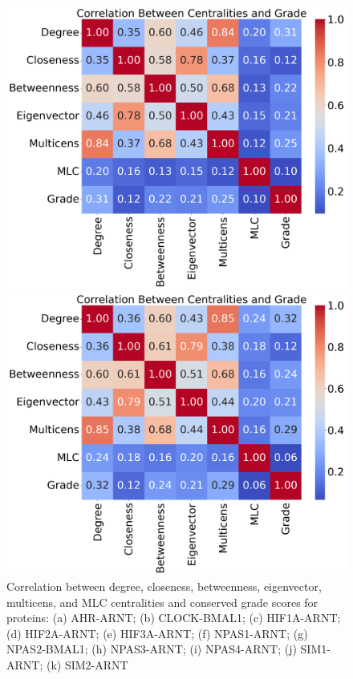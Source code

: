 \documentclass[10pt,letterpaper]{article}
\begin{document}
\begin{figure}[h!]
\begin{minipage}[b]{0.28\linewidth}
	\centering
	\includegraphics[width=\textwidth]{figs/fig37-sim1_arnt-corr.png}
	\subcaption{}
\end{minipage}
\hspace{0.5cm}
\begin{minipage}[b]{0.28\linewidth}
	\centering
	\includegraphics[width=\textwidth]{figs/fig38-sim2_arnt-corr.png}
	\subcaption{}
\end{minipage}

\caption{Correlation between degree, closeness, betweenness, eigenvector, multicens, and MLC centralities and conserved grade scores for proteins: (a) AHR-ARNT; (b) CLOCK-BMAL1; (c) HIF1A-ARNT; (d) HIF2A-ARNT; (e) HIF3A-ARNT; (f) NPAS1-ARNT; (g) NPAS2-BMAL1; (h) NPAS3-ARNT; (i) NPAS4-ARNT; (j) SIM1-ARNT; (k) SIM2-ARNT\label{fig:corr1}}
\end{figure}
\end{document}
